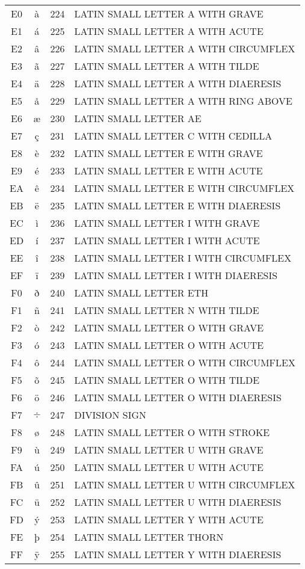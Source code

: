 \documentclass[10pt]{article}
\begin{document}
\pagebreak
\begin{tabular}{ccrl}
E0&à&224&LATIN SMALL LETTER A WITH GRAVE\\
E1&á&225&LATIN SMALL LETTER A WITH ACUTE\\
E2&â&226&LATIN SMALL LETTER A WITH CIRCUMFLEX\\
E3&ã&227&LATIN SMALL LETTER A WITH TILDE\\
E4&ä&228&LATIN SMALL LETTER A WITH DIAERESIS\\
E5&å&229&LATIN SMALL LETTER A WITH RING ABOVE\\
E6&æ&230&LATIN SMALL LETTER AE\\
E7&ç&231&LATIN SMALL LETTER C WITH CEDILLA\\
E8&è&232&LATIN SMALL LETTER E WITH GRAVE\\
E9&é&233&LATIN SMALL LETTER E WITH ACUTE\\
EA&ê&234&LATIN SMALL LETTER E WITH CIRCUMFLEX\\
EB&ë&235&LATIN SMALL LETTER E WITH DIAERESIS\\
EC&ì&236&LATIN SMALL LETTER I WITH GRAVE\\
ED&í&237&LATIN SMALL LETTER I WITH ACUTE\\
EE&î&238&LATIN SMALL LETTER I WITH CIRCUMFLEX\\
EF&ï&239&LATIN SMALL LETTER I WITH DIAERESIS\\
F0&ð&240&LATIN SMALL LETTER ETH\\
F1&ñ&241&LATIN SMALL LETTER N WITH TILDE\\
F2&ò&242&LATIN SMALL LETTER O WITH GRAVE\\
F3&ó&243&LATIN SMALL LETTER O WITH ACUTE\\
F4&ô&244&LATIN SMALL LETTER O WITH CIRCUMFLEX\\
F5&õ&245&LATIN SMALL LETTER O WITH TILDE\\
F6&ö&246&LATIN SMALL LETTER O WITH DIAERESIS\\
F7&$÷$&247&DIVISION SIGN\\
F8&ø&248&LATIN SMALL LETTER O WITH STROKE\\
F9&ù&249&LATIN SMALL LETTER U WITH GRAVE\\
FA&ú&250&LATIN SMALL LETTER U WITH ACUTE\\
FB&û&251&LATIN SMALL LETTER U WITH CIRCUMFLEX\\
FC&ü&252&LATIN SMALL LETTER U WITH DIAERESIS\\
FD&ý&253&LATIN SMALL LETTER Y WITH ACUTE\\
FE&þ&254&LATIN SMALL LETTER THORN\\
FF&ÿ&255&LATIN SMALL LETTER Y WITH DIAERESIS\\
\end{tabular}
\end{document}
